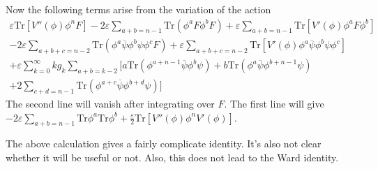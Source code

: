 Now the following terms arise from the variation of the action
\begin{align*}
	\varepsilon \mathrm{Tr}[V''(\phi)\phi^n F]-2 \varepsilon \sum_{a+b=n-1} \mathrm{Tr} (\phi^a F \phi^b F) + \varepsilon \sum_{a+b=n-1} \mathrm{Tr}[V'(\phi)\phi^a F \phi^b] \\
	-2 \varepsilon \sum_{a+b+c=n-2} \mathrm{Tr} (\phi^a \overline{\psi} \phi^b \psi \phi^c F) + \varepsilon \sum_{a+b+c=n-2} \mathrm{Tr} [V'(\phi) \phi^a \overline{\psi} \phi^b \psi \phi^c] \\
	+\varepsilon \sum_{k=0}^\infty k g_k \sum_{a+b=k-2} \Big[ a \mathrm{Tr}(\phi^{a+n-1}\overline{\psi}\phi^b\psi) + b \mathrm{Tr}(\phi^a \overline{\psi}\phi^{b+n-1}\psi)   \\
	+ 2 \sum_{c+d=n-1} \mathrm{Tr}(\phi^{a+c}\overline{\psi}\phi^{b+d}\psi)\Big]
\end{align*}
The second line will vanish after integrating over $F$.
The first line will give $-2\varepsilon \sum_{a+b=n-1} \mathrm{Tr}\phi^a \mathrm{Tr}\phi^b + \frac{\varepsilon}{2} \mathrm{Tr}[V''(\phi)\phi^n V'(\phi)]$.
\begin{remark}
The above calculation gives a fairly complicate identity.
It's also not clear whether it will be useful or not.
Also, this does not lead to the Ward identity.
\end{remark}
